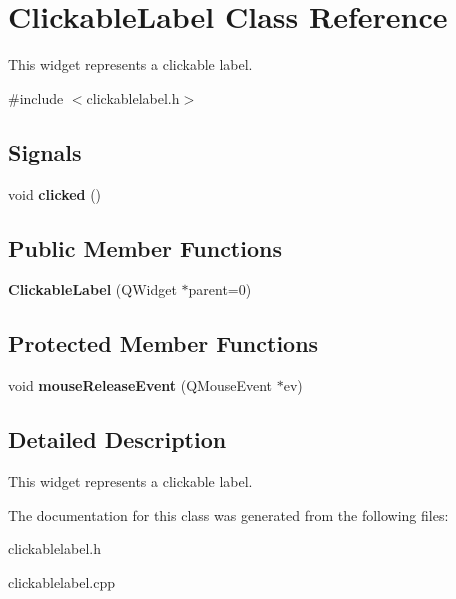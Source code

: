 \hypertarget{class_clickable_label}{
\section{ClickableLabel Class Reference}
\label{class_clickable_label}
}


This widget represents a clickable label.  




{\ttfamily \#include $<$clickablelabel.h$>$}

\subsection*{Signals}
\begin{DoxyCompactItemize}
\item 
\hypertarget{class_clickable_label_aba68cb811a595c6d90f5c994f2b31f4b}{
void {\bfseries clicked} ()}
\label{class_clickable_label_aba68cb811a595c6d90f5c994f2b31f4b}

\end{DoxyCompactItemize}
\subsection*{Public Member Functions}
\begin{DoxyCompactItemize}
\item 
\hypertarget{class_clickable_label_a62b23a9a7f7aed36692db03640561072}{
{\bfseries ClickableLabel} (QWidget $\ast$parent=0)}
\label{class_clickable_label_a62b23a9a7f7aed36692db03640561072}

\end{DoxyCompactItemize}
\subsection*{Protected Member Functions}
\begin{DoxyCompactItemize}
\item 
\hypertarget{class_clickable_label_a8c4c91725ba25618df1c7da058054148}{
void {\bfseries mouseReleaseEvent} (QMouseEvent $\ast$ev)}
\label{class_clickable_label_a8c4c91725ba25618df1c7da058054148}

\end{DoxyCompactItemize}


\subsection{Detailed Description}
This widget represents a clickable label. 

The documentation for this class was generated from the following files:\begin{DoxyCompactItemize}
\item 
clickablelabel.h\item 
clickablelabel.cpp\end{DoxyCompactItemize}
